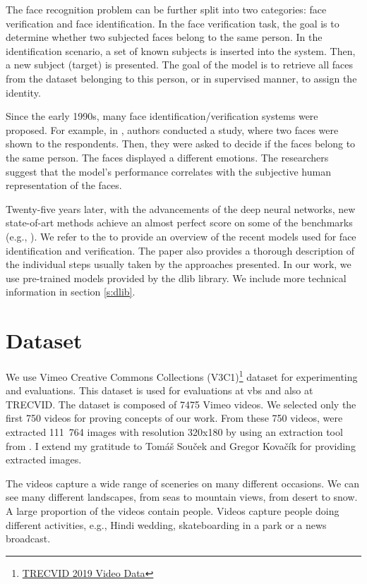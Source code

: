 The face recognition problem can be further split into two categories: face verification and face identification. In the face verification task, the goal is to determine whether two subjected faces belong to the same person. In the identification scenario,
a set of known subjects is inserted into the system. Then, a new subject (target) is presented. The goal of the model is to retrieve all faces from the dataset belonging to this person, or in supervised manner, to assign the identity.

Since the early 1990s, many face identification/verification systems were proposed. For example, in \citep{kalocsai1998face}, authors conducted a study, where two faces were shown to the respondents. Then, they were asked to decide if the faces belong to the same person. The faces displayed a different emotions. The researchers suggest that the model's performance correlates with the subjective human representation of the faces.

Twenty-five years later, with the advancements of the deep neural networks, new state-of-art methods achieve an almost perfect score on some of the benchmarks (e.g., \citep{huang2008labeled}). We refer to the \citep{masi2018deep} to provide an overview of the recent models used for face identification and verification. The paper also provides a thorough description of the individual steps usually taken by the approaches presented. In our work, we use pre-trained models provided by the dlib library. We include more technical information in section \ref{s:dlib}.

\section{Dataset}
\label{s:dataset}

We use Vimeo Creative Commons Collections (V3C1)\footnote{\href{https://www-nlpir.nist.gov/projects/tv2019/data.html}{TRECVID 2019 Video Data}} dataset for experimenting and evaluations. This dataset is used for evaluations at \acrshort{vbs} and also at TRECVID. The dataset is composed of 7475 Vimeo videos. We selected only the first 750 videos for proving concepts of our work. From these 750 videos, were extracted 111\ 764 images with resolution 320x180 by using an extraction tool from \cite{lokovc2019framework}. I extend my gratitude to Tomáš Souček and Gregor Kovačík for providing extracted images.

The videos capture a wide range of sceneries on many different occasions. We can see many different landscapes, from seas to mountain views, from desert to snow. A large proportion of the videos contain people. Videos capture people doing different activities, e.g., Hindi wedding, skateboarding in a park or a news broadcast.


